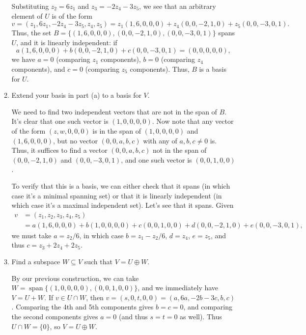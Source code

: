 \documentclass[letterpaper,12pt]{article}
\begin{document}
\begin{enumerate}
\begin{enumerate}
 Substituting $z_2=6z_1$ and $z_3 = -2z_4-3z_5$, we see that an arbitrary element of $U$ is of the form 
 \[
 v=(z_1, 6z_1, -2z_4-3z_5,z_4,z_5) = z_1(1,6,0,0,0)+z_4(0,0,-2,1,0)+z_5(0,0,-3,0,1).
 \]
 Thus, the set $B=\{(1,6,0,0,0),(0,0,-2,1,0),(0,0,-3,0,1)\}$ spans $U$, and it is linearly independent: if
 \[
 a(1,6,0,0,0)+b(0,0,-2,1,0)+c(0,0,-3,0,1) = (0,0,0,0,0),
 \]
 we have $a=0$ (comparing $z_1$ components), $b=0$ (comparing $z_4$ components), and $c=0$ (comparing $z_5$ components). Thus, $B$ is a basis for $U$.
 
 \bigskip
 
 \item Extend your basis in part (a) to a basis for $V$.
 
 \bigskip
 
 We need to find two independent vectors that are not in the span of $B$. It's clear that one such vector is $(1,0,0,0,0)$. Now note that any vector of the form $(z,w,0,0,0)$ is in the span of $(1,0,0,0,0)$ and $(1,6,0,0,0)$, but no vector $(0,0,a,b,c)$ with any of $a,b,c\neq 0$ is. Thus, it suffices to find a vector $(0,0,a,b,c)$ not in the span of $(0,0,-2,1,0)$ and $(0,0,-3,0,1)$, and one such vector is $(0,0,1,0,0)$.
 
 To verify that this is a basis, we can either check that it spans (in which case it's a minimal spanning set) or that it is linearly independent (in which case it's a maximal independent set). Let's see that it spans. Given 
 \begin{align*}
 v&=(z_1,z_2,z_3,z_4,z_5)\\&=a(1,6,0,0,0)+b(1,0,0,0,0)+c(0,0,1,0,0)+d(0,0,-2,1,0)+e(0,0,-3,0,1),
 \end{align*}
 we must take $a=z_2/6$, in which case $b=z_1-z_2/6$, $d=z_4$, $e=z_5$, and thus $c=z_3+2z_4+2z_5$.
 
 \bigskip
 
 
 \item Find a subspace $W\subseteq V$ such that $V=U\oplus W$.
 
 \bigskip
 
 By our previous construction, we can take $W=\operatorname{span}\{(1,0,0,0,0),(0,0,1,0,0)\}$, and we immediately have $V=U+W$. If $v\in U\cap W$, then $v=(s,0,t,0,0) = (a,6a,-2b-3c,b,c)$. Comparing the 4th and 5th components gives $b=c=0$, and comparing the second components gives $a=0$ (and thus $s=t=0$ as well). Thus $U\cap W = \{0\}$, so $V=U\oplus W$.

 \end{enumerate}


\end{enumerate}
\end{document}
